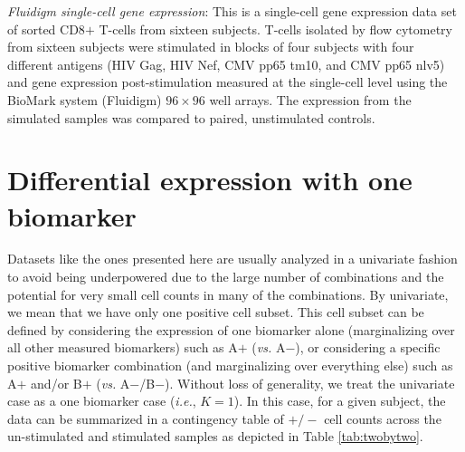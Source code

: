 \documentclass[12pt,oupdraft]{biostatistics}
\begin{document}
\textit{Fluidigm single-cell gene expression}: This is a single-cell gene expression data set of sorted CD8$+$ T-cells from sixteen subjects. T-cells isolated by flow cytometry from sixteen subjects were stimulated in blocks of four subjects with four different antigens (HIV Gag, HIV Nef, CMV pp65 tm10, and CMV pp65 nlv5) and gene expression post-stimulation measured at the single-cell level using the BioMark system (Fluidigm) $96 \times 96$ well arrays. The expression from the simulated samples  was compared to paired, unstimulated controls.


\section{Differential expression with one biomarker}
\label{s:DEone}
Datasets like the ones presented here are usually analyzed in a univariate fashion to avoid being underpowered due to the large number of combinations and the potential for very small cell counts in many of the combinations. By univariate, we mean that we have only one positive cell subset. This cell subset can be defined by considering the expression of one biomarker alone (marginalizing over all other measured biomarkers) such as A$+$ (\textit{vs.} A$-$), or considering a specific positive biomarker combination (and marginalizing over everything else) such as A$+$ and/or B$+$ (\textit{vs.} A$-$/B$-$). Without loss of generality, we treat the univariate case as a one biomarker case (\textit{i.e.}, $K=1$). In this case, for a given subject, the data can be summarized in a contingency table of $+/-$ cell counts across the un-stimulated and stimulated samples as depicted in Table \ref{tab:twobytwo}.

%
\end{document}
